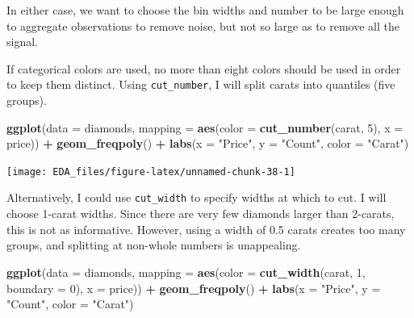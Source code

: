 \documentclass[]{book}
\newenvironment{Shaded}{\begin{snugshade}}{\end{snugshade}}
\newcommand{\DataTypeTok}[1]{\textcolor[rgb]{0.13,0.29,0.53}{#1}}
\newcommand{\DecValTok}[1]{\textcolor[rgb]{0.00,0.00,0.81}{#1}}
\newcommand{\KeywordTok}[1]{\textcolor[rgb]{0.13,0.29,0.53}{\textbf{#1}}}
\newcommand{\NormalTok}[1]{#1}
\newcommand{\OperatorTok}[1]{\textcolor[rgb]{0.81,0.36,0.00}{\textbf{#1}}}
\newcommand{\StringTok}[1]{\textcolor[rgb]{0.31,0.60,0.02}{#1}}
\theoremstyle{plain}
\theoremstyle{remark}
\begin{document}
In either case, we want to choose the bin widths and number to be large enough
to aggregate observations to remove noise, but not so large as to remove all the signal.

If categorical colors are used, no more than eight colors should be used
in order to keep them distinct. Using \texttt{cut\_number}, I will split carats into
quantiles (five groups).

\begin{Shaded}
\begin{Highlighting}[]
\KeywordTok{ggplot}\NormalTok{(}\DataTypeTok{data =}\NormalTok{ diamonds,}
       \DataTypeTok{mapping =} \KeywordTok{aes}\NormalTok{(}\DataTypeTok{color =} \KeywordTok{cut_number}\NormalTok{(carat, }\DecValTok{5}\NormalTok{), }\DataTypeTok{x =}\NormalTok{ price)) }\OperatorTok{+}
\StringTok{  }\KeywordTok{geom_freqpoly}\NormalTok{() }\OperatorTok{+}
\StringTok{  }\KeywordTok{labs}\NormalTok{(}\DataTypeTok{x =} \StringTok{"Price"}\NormalTok{, }\DataTypeTok{y =} \StringTok{"Count"}\NormalTok{, }\DataTypeTok{color =} \StringTok{"Carat"}\NormalTok{)}
\end{Highlighting}
\end{Shaded}

\begin{center}\texttt{[image: EDA\_files/figure-latex/unnamed-chunk-38-1]} \end{center}

Alternatively, I could use \texttt{cut\_width} to specify widths at which to cut.
I will choose 1-carat widths. Since there are very few diamonds larger than
2-carats, this is not as informative. However, using a width of 0.5 carats
creates too many groups, and splitting at non-whole numbers is unappealing.

\begin{Shaded}
\begin{Highlighting}[]
\KeywordTok{ggplot}\NormalTok{(}\DataTypeTok{data =}\NormalTok{ diamonds,}
       \DataTypeTok{mapping =} \KeywordTok{aes}\NormalTok{(}\DataTypeTok{color =} \KeywordTok{cut_width}\NormalTok{(carat, }\DecValTok{1}\NormalTok{, }\DataTypeTok{boundary =} \DecValTok{0}\NormalTok{), }\DataTypeTok{x =}\NormalTok{ price)) }\OperatorTok{+}
\StringTok{  }\KeywordTok{geom_freqpoly}\NormalTok{() }\OperatorTok{+}
\StringTok{  }\KeywordTok{labs}\NormalTok{(}\DataTypeTok{x =} \StringTok{"Price"}\NormalTok{, }\DataTypeTok{y =} \StringTok{"Count"}\NormalTok{, }\DataTypeTok{color =} \StringTok{"Carat"}\NormalTok{)  }
\end{Highlighting}
\end{Shaded}
\end{document}
